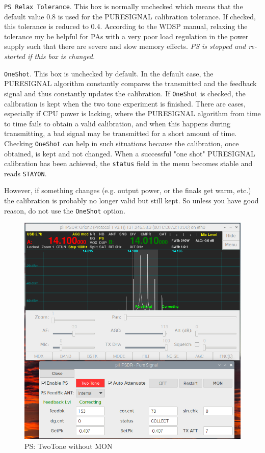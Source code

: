 \documentclass[12pt]{book}
\def\rett#1{\texttt{\color{red}#1}}
\def\bltt#1{\texttt{\color{blue}#1}}
\begin{document}
\rett{PS Relax Tolerance}. This box is normally unchecked which means that the default
value 0.8 is used for the PURESIGNAL calibration tolerance. If checked, this tolerance
is reduced to 0.4. According to the WDSP manual, relaxing the tolerance my be helpful
for PAs with a very poor load regulation in the power supply such that there are
severe and slow memory effects. \textit{PS is stopped and re-started if
this box is changed.}

 \rett{OneShot}. This box is unchecked by default. In the default case, the PURESIGNAL
 algorithm constantly compares the transmitted and the feedback signal and thus
 constantly updates the calibration. If \rett{OneShot} is checked, the calibration
 is kept when the two tone experiment is finished. There are cases, especially if
 CPU power is lacking, where the PURESIGNAL algorithm from time to time fails to obtain
 a valid calibration, and when this happens during transmitting, a bad signal may
 be transmitted for a short amount of time. Checking \rett{OneShot} can help in such
 situations because the calibration, once obtained, is kept and not changed.
 When a successful "one shot" PURESIGNAL calibration has been achieved, the \bltt{status}
 field in the menu becomes stable and reads \texttt{STAYON}.

 However, if something changes (e.g. output power, or the finals get warm, etc.) the
 calibration is probably no longer valid but still kept. So unless you have good reason,
 do not use the \rett{OneShot} option.

\begin{figure}[ht]
\center
\includegraphics[width=12cm]{PSnomon.png}
\caption{PS: TwoTone without MON}
\label{fig:PSnomon}
\end{figure}
\end{document}
